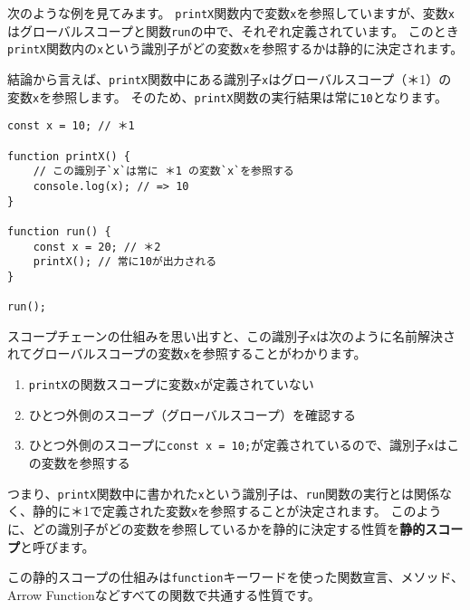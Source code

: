 次のような例を見てみます。
\texttt{printX}関数内で変数\texttt{x}を参照していますが、変数\texttt{x}はグローバルスコープと関数\texttt{run}の中で、それぞれ定義されています。
このとき\texttt{printX}関数内の\texttt{x}という識別子がどの変数\texttt{x}を参照するかは静的に決定されます。

結論から言えば、\texttt{printX}関数中にある識別子\texttt{x}はグローバルスコープ（＊1）の変数\texttt{x}を参照します。
そのため、\texttt{printX}関数の実行結果は常に\texttt{10}となります。

\begin{lstlisting}
const x = 10; // ＊1

function printX() {
    // この識別子`x`は常に ＊1 の変数`x`を参照する
    console.log(x); // => 10
}

function run() {
    const x = 20; // ＊2
    printX(); // 常に10が出力される
}

run();
\end{lstlisting}

スコープチェーンの仕組みを思い出すと、この識別子\texttt{x}は次のように名前解決されてグローバルスコープの変数\texttt{x}を参照することがわかります。

\begin{enumerate}
\def\labelenumi{\arabic{enumi}.}
\item
  \texttt{printX}の関数スコープに変数\texttt{x}が定義されていない
\item
  ひとつ外側のスコープ（グローバルスコープ）を確認する
\item
  ひとつ外側のスコープに\texttt{const x = 10;}が定義されているので、識別子\texttt{x}はこの変数を参照する
\end{enumerate}

つまり、\texttt{printX}関数中に書かれた\texttt{x}という識別子は、\texttt{run}関数の実行とは関係なく、静的に＊1で定義された変数\texttt{x}を参照することが決定されます。
このように、どの識別子がどの変数を参照しているかを静的に決定する性質を\textbf{静的スコープ}と呼びます。

この静的スコープの仕組みは\texttt{function}キーワードを使った関数宣言、メソッド、Arrow
Functionなどすべての関数で共通する性質です。

